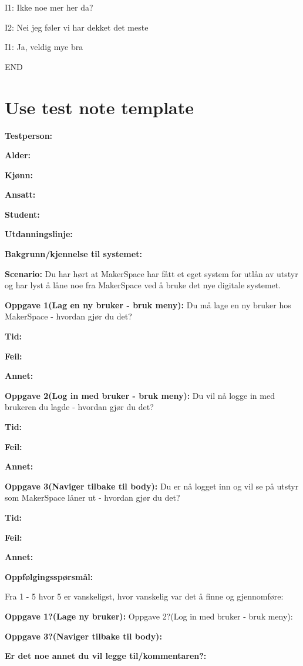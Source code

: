 I1: Ikke noe mer her da?

I2: Nei jeg føler vi har dekket det meste

I1: Ja, veldig mye bra  

END

\newpage
\section{Use test note template}

\textbf{Testperson:} 

\textbf{Alder:}

\textbf{Kjønn:} 

\textbf{Ansatt:}

\textbf{Student:}

\textbf{Utdanningslinje:}

\textbf{Bakgrunn/kjennelse til systemet:}

\textbf{Scenario:} Du har hørt at MakerSpace har fått et eget system for utlån av utstyr og har lyst å låne noe fra MakerSpace ved å bruke det nye digitale systemet. 

\textbf{Oppgave 1(Lag en ny bruker - bruk meny):}  Du må lage en ny bruker hos MakerSpace - hvordan gjør du det?

\textbf{Tid:} 

\textbf{Feil:} 

\textbf{Annet:}

\textbf{Oppgave 2(Log in med bruker - bruk meny):} Du vil nå logge in med brukeren du lagde - hvordan gjør du det?

\textbf{Tid:}

\textbf{Feil:}

\textbf{Annet:}

\textbf{Oppgave 3(Naviger tilbake til body):} Du er nå logget inn og vil se på utstyr som MakerSpace låner ut - hvordan gjør du det?

\textbf{Tid:}

\textbf{Feil:}

\textbf{Annet:}

\textbf{Oppfølgingsspørsmål:} 

Fra 1 - 5 hvor 5 er vanskeligst, hvor vanskelig var det å finne og gjennomføre:

\textbf{Oppgave 1?(Lage ny bruker):} 
Oppgave 2?(Log in med bruker - bruk meny):

\textbf{Oppgave 3?(Naviger tilbake til body):}

\textbf{Er det noe annet du vil legge til/kommentaren?:}


